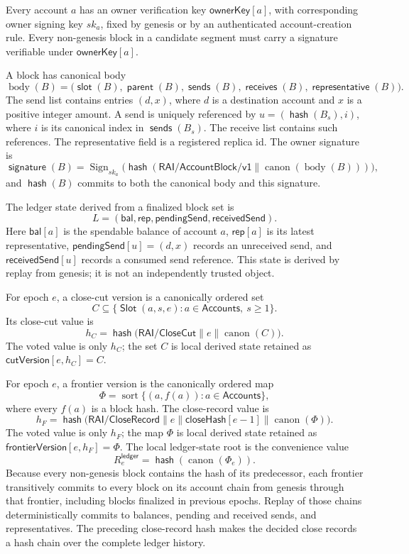 \documentclass[sigplan,twocolumn,review,anonymous]{acmart}
\newcommand{\func}[1]{\operatorname{\mathsf{#1}}}
\newcommand{\hash}{\func{hash}}
\newcommand{\Slot}{\func{Slot}}
\newcommand{\closeHash}{\mathsf{closeHash}}
\newcommand{\parent}{\func{parent}}
\newcommand{\slotOf}{\func{slot}}
\newcommand{\cutVersion}{\mathsf{cutVersion}}
\newcommand{\frontierVersion}{\mathsf{frontierVersion}}
\newcommand{\ownerKey}{\mathsf{ownerKey}}
\newcommand{\signatureOf}{\func{signature}}
\newcommand{\sendsOf}{\func{sends}}
\newcommand{\receivesOf}{\func{receives}}
\newcommand{\representativeOf}{\func{representative}}
\newcommand{\bal}{\mathsf{bal}}
\newcommand{\repOf}{\mathsf{rep}}
\newcommand{\pendingSend}{\mathsf{pendingSend}}
\newcommand{\receivedSend}{\mathsf{receivedSend}}
\begin{document}
Every account \(a\) has an owner verification key \(\ownerKey[a]\), with corresponding owner signing
key \(sk_a\), fixed by genesis or by an authenticated account-creation rule.  Every non-genesis block
in a candidate segment must carry a signature verifiable under \(\ownerKey[a]\).

A block has canonical body
\[
\operatorname{body}(B)=
\bigl(\slotOf(B),\parent(B),\sendsOf(B),\receivesOf(B),\representativeOf(B)\bigr).
\]
The send list contains entries \((d,x)\), where \(d\) is a destination account and \(x\) is a positive
integer amount.  A send is uniquely referenced by \(u=(\hash(B_s),i)\), where \(i\) is its canonical
index in \(\sendsOf(B_s)\).  The receive list contains such references.  The representative field is a
registered replica id.  The owner signature is
\[
\signatureOf(B)=\operatorname{Sign}_{sk_a}
\bigl(\hash(\mathsf{RAI/AccountBlock/v1}\parallel\operatorname{canon}(\operatorname{body}(B)))\bigr),
\]
and \(\hash(B)\) commits to both the canonical body and this signature.

The ledger state derived from a finalized block set is
\[
L=(\bal,\repOf,\pendingSend,\receivedSend).
\]
Here \(\bal[a]\) is the spendable balance of account \(a\), \(\repOf[a]\) is its latest
representative, \(\pendingSend[u]=(d,x)\) records an unreceived send, and
\(\receivedSend[u]\) records a consumed send reference.  This state is derived by replay from genesis;
it is not an independently trusted object.

For epoch \(e\), a close-cut version is a canonically ordered set
\[
C\subseteq\{\Slot(a,s,e):a\in\mathsf{Accounts},\ s\ge1\}.
\]
Its close-cut value is
\[
h_C=\hash\bigl(\mathsf{RAI/CloseCut}\parallel e\parallel\operatorname{canon}(C)\bigr).
\]
The voted value is only \(h_C\); the set \(C\) is local derived state retained as
\(\cutVersion[e,h_C]=C\).

For epoch \(e\), a frontier version is the canonically ordered map
\[
\Phi=\operatorname{sort}\{(a,f(a)):a\in\mathsf{Accounts}\},
\]
where every \(f(a)\) is a block hash.  The close-record value is
\[
h_F=\hash\bigl(
\mathsf{RAI/CloseRecord}\parallel e\parallel\closeHash[e-1]
\parallel\operatorname{canon}(\Phi)
\bigr).
\]
The voted value is only \(h_F\); the map \(\Phi\) is local derived state retained as
\(\frontierVersion[e,h_F]=\Phi\).  The local ledger-state root is the convenience value
\[
R^{\mathsf{ledger}}_e=\hash(\operatorname{canon}(\Phi_e)).
\]
Because every non-genesis block contains the hash of its predecessor, each frontier transitively
commits to every block on its account chain from genesis through that frontier, including blocks
finalized in previous epochs.  Replay of those chains deterministically commits to balances, pending
and received sends, and representatives.  The preceding close-record hash makes the decided close
records a hash chain over the complete ledger history.
\end{document}
